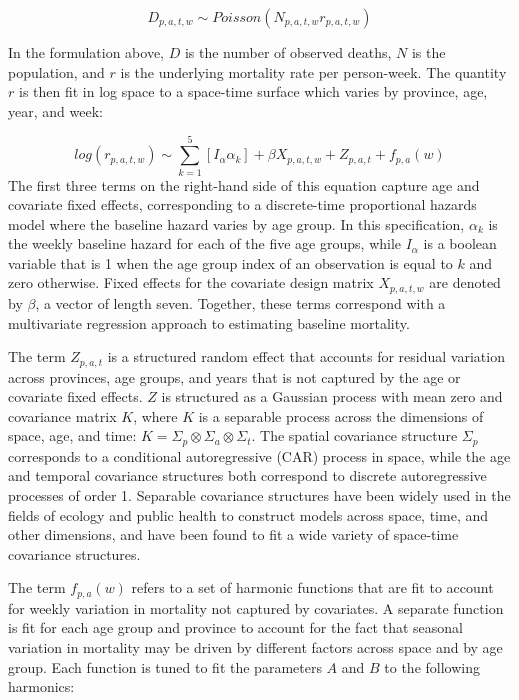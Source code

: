 \documentclass[
]{report}
\begin{document}
\[D_{p,a,t,w} \sim Poisson(N_{p,a,t,w}r_{p,a,t,w})\]

In the formulation above, \(D\) is the number of observed deaths, \(N\) is the population, and \(r\) is the underlying mortality rate per person-week. The quantity \(r\) is then fit in log space to a space-time surface which varies by province, age, year, and week:

\[log(r_{p,a,t,w}) \sim \sum_{k=1}^{5}[I_{\alpha}\alpha_{k}] + \beta X_{p,a,t,w} + Z_{p,a,t} + f_{p,a}(w)\]
The first three terms on the right-hand side of this equation capture age and covariate fixed effects, corresponding to a discrete-time proportional hazards model where the baseline hazard varies by age group\autocite{Cox1972,Burstein2019}. In this specification, \(\alpha_k\) is the weekly baseline hazard for each of the five age groups, while \(I_\alpha\) is a boolean variable that is 1 when the age group index of an observation is equal to \(k\) and zero otherwise. Fixed effects for the covariate design matrix \(X_{p,a,t,w}\) are denoted by \(\beta\), a vector of length seven. Together, these terms correspond with a multivariate regression approach to estimating baseline mortality\autocite{Ederer1961}.

The term \(Z_{p,a,t}\) is a structured random effect that accounts for residual variation across provinces, age groups, and years that is not captured by the age or covariate fixed effects. \(Z\) is structured as a Gaussian process with mean zero and covariance matrix \(K\), where \(K\) is a separable process across the dimensions of space, age, and time: \(K = \Sigma_p \otimes \Sigma_a \otimes \Sigma_t\). The spatial covariance structure \(\Sigma_p\) corresponds to a conditional autoregressive (CAR) process in space\autocite{Riebler2016}, while the age and temporal covariance structures both correspond to discrete autoregressive processes of order 1. Separable covariance structures have been widely used in the fields of ecology and public health to construct models across space, time, and other dimensions\autocite{Thorson2017,Wakefield2019}, and have been found to fit a wide variety of space-time covariance structures\autocite{Huang2007}.

The term \(f_{p,a}(w)\) refers to a set of harmonic functions that are fit to account for weekly variation in mortality not captured by covariates. A separate function is fit for each age group and province to account for the fact that seasonal variation in mortality may be driven by different factors across space and by age group. Each function is tuned to fit the parameters \(A\) and \(B\) to the following harmonics:
\end{document}

